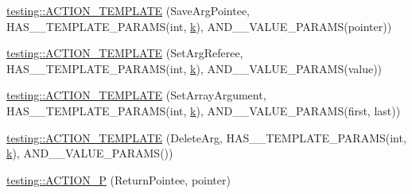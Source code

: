 \begin{DoxyCompactItemize}
\item 
\hyperlink{namespacetesting_a31565a90ad7f08c1a88e4b138957172c}{testing\+::\+A\+C\+T\+I\+O\+N\+\_\+\+T\+E\+M\+P\+L\+A\+TE} (Save\+Arg\+Pointee, H\+A\+S\+\_\+\_\+\+T\+E\+M\+P\+L\+A\+T\+E\+\_\+\+P\+A\+R\+A\+MS(int, \hyperlink{jquery_8js_ab26645c014aa005ecedef329ecf58c99}{k}), A\+N\+D\+\_\+\_\+\+V\+A\+L\+U\+E\+\_\+\+P\+A\+R\+A\+MS(pointer))
\item 
\hyperlink{namespacetesting_adfd3c9538285d257370f955aa81488f1}{testing\+::\+A\+C\+T\+I\+O\+N\+\_\+\+T\+E\+M\+P\+L\+A\+TE} (Set\+Arg\+Referee, H\+A\+S\+\_\+\_\+\+T\+E\+M\+P\+L\+A\+T\+E\+\_\+\+P\+A\+R\+A\+MS(int, \hyperlink{jquery_8js_ab26645c014aa005ecedef329ecf58c99}{k}), A\+N\+D\+\_\+\_\+\+V\+A\+L\+U\+E\+\_\+\+P\+A\+R\+A\+MS(value))
\item 
\hyperlink{namespacetesting_a2b0f090219db3bb0630d5ce6f7d911d8}{testing\+::\+A\+C\+T\+I\+O\+N\+\_\+\+T\+E\+M\+P\+L\+A\+TE} (Set\+Array\+Argument, H\+A\+S\+\_\+\_\+\+T\+E\+M\+P\+L\+A\+T\+E\+\_\+\+P\+A\+R\+A\+MS(int, \hyperlink{jquery_8js_ab26645c014aa005ecedef329ecf58c99}{k}), A\+N\+D\+\_\+\_\+\+V\+A\+L\+U\+E\+\_\+\+P\+A\+R\+A\+MS(first, last))
\item 
\hyperlink{namespacetesting_a37a5ebfe68fd8dedf8bd82a5ebddcb7b}{testing\+::\+A\+C\+T\+I\+O\+N\+\_\+\+T\+E\+M\+P\+L\+A\+TE} (Delete\+Arg, H\+A\+S\+\_\+\_\+\+T\+E\+M\+P\+L\+A\+T\+E\+\_\+\+P\+A\+R\+A\+MS(int, \hyperlink{jquery_8js_ab26645c014aa005ecedef329ecf58c99}{k}), A\+N\+D\+\_\+\_\+\+V\+A\+L\+U\+E\+\_\+\+P\+A\+R\+A\+MS())
\item 
\hyperlink{namespacetesting_a3d58f0d746946064154cd257d368599d}{testing\+::\+A\+C\+T\+I\+O\+N\+\_\+P} (Return\+Pointee, pointer)
\end{DoxyCompactItemize}
